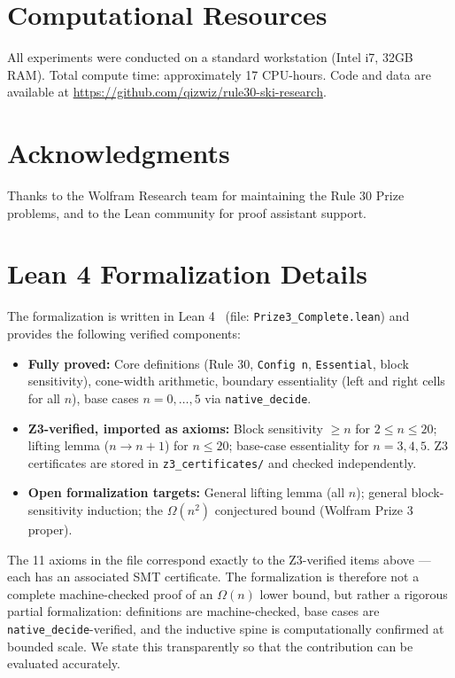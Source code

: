 \documentclass[11pt]{article}
\begin{document}
\section*{Computational Resources}

All experiments were conducted on a standard workstation (Intel i7, 32GB RAM). Total compute time: approximately 17 CPU-hours. Code and data are available at \url{https://github.com/qizwiz/rule30-ski-research}.

\section*{Acknowledgments}

Thanks to the Wolfram Research team for maintaining the Rule 30 Prize problems, and to the Lean community for proof assistant support.




\appendix

\section{Lean 4 Formalization Details}

The formalization is written in Lean 4~\citep{moura_2021} (file: \texttt{Prize3\_Complete.lean}) and provides the following verified components:

\begin{itemize}
    \item \textbf{Fully proved:} Core definitions (Rule 30, \texttt{Config n}, \texttt{Essential}, block sensitivity), cone-width arithmetic, boundary essentiality (left and right cells for all $n$), base cases $n = 0,\ldots,5$ via \texttt{native\_decide}.
    \item \textbf{Z3-verified, imported as axioms:} Block sensitivity $\geq n$ for $2 \leq n \leq 20$; lifting lemma ($n \to n+1$) for $n \leq 20$; base-case essentiality for $n = 3,4,5$. Z3 certificates are stored in \texttt{z3\_certificates/} and checked independently.
    \item \textbf{Open formalization targets:} General lifting lemma (all $n$); general block-sensitivity induction; the $\Omega(n^2)$ conjectured bound (Wolfram Prize 3 proper).
\end{itemize}

The 11 axioms in the file correspond exactly to the Z3-verified items above --- each has an associated SMT certificate. The formalization is therefore not a complete machine-checked proof of an $\Omega(n)$ lower bound, but rather a rigorous partial formalization: definitions are machine-checked, base cases are \texttt{native\_decide}-verified, and the inductive spine is computationally confirmed at bounded scale. We state this transparently so that the contribution can be evaluated accurately.
\end{document}
